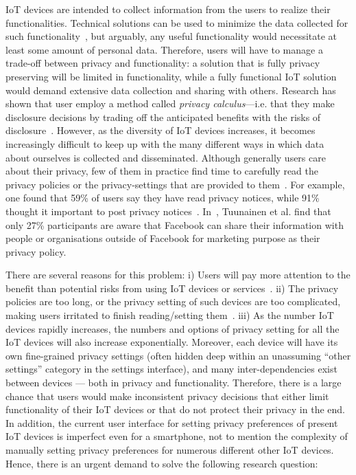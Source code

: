 IoT devices are intended to collect information from the users to realize their functionalities. Technical solutions can be used to minimize the data collected for such functionality~\cite{kobsa2006privacy,pfitzmann2001anonymity,verykios2004state}, but arguably, any useful functionality would necessitate at least some amount of personal data. Therefore, users will have to manage a trade-off between privacy and functionality: a solution that is fully privacy preserving will be limited in functionality, while a fully functional IoT solution would demand extensive data collection and sharing with others. Research has shown that user employ a method called \textit{privacy calculus}---i.e. that they make disclosure decisions by trading off the anticipated benefits with the risks of disclosure~\cite{culnan1993did,laufer1977privacy,taylor2009privacy}. However, as the diversity of IoT devices increases, it becomes increasingly difficult to keep up with the many different ways in which data about ourselves is collected and disseminated. Although generally users care about their privacy, few of them in practice find time to carefully read the privacy policies or the privacy-settings that are provided to them~\cite{earp2005examining, gindin2009nobody}. For example, one found that 59\% of users say they have read privacy notices, while 91\% thought it important to post privacy notices~\cite{earp2005examining}. In~\cite{tuunainen2009users}, Tuunainen et al. find that only 27\% participants are aware that Facebook can share their information with people or organisations outside of Facebook for marketing purpose as their privacy policy.

There are several reasons for this problem: i) Users will pay more attention to the benefit than potential risks from using IoT devices or services~\cite{forbesIoT}. ii) The privacy policies are too long, or the privacy setting of such devices are too complicated, making users irritated to finish reading/setting them~\cite{milne2004strategies}. iii) As the number IoT devices rapidly increases, the numbers and options of privacy setting for all the IoT devices will also increase exponentially. Moreover, each device will have its own fine-grained privacy settings (often hidden deep within an unassuming ``other settings” category in the settings interface), and many inter-dependencies exist between devices --- both in privacy and functionality. Therefore, there is a large chance that users would make inconsistent privacy decisions that either limit functionality of their IoT devices or that do not protect their privacy in the end. In addition, the current user interface for setting privacy preferences of present IoT devices is imperfect even for a smartphone, not to mention the complexity of manually setting privacy preferences for numerous different other IoT devices. Hence, there is an urgent demand to solve the following research question:


